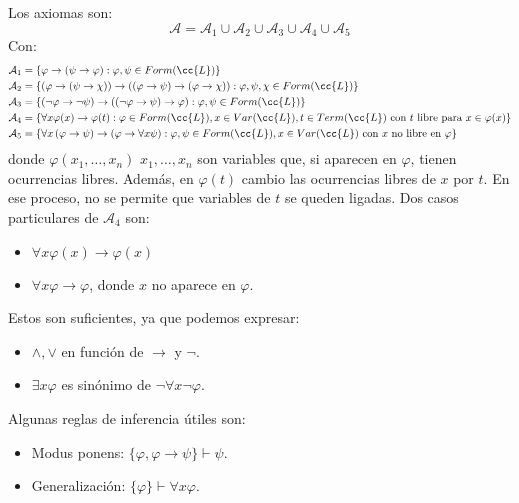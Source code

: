 Los axiomas son:
\begin{equation*}
    \mathcal{A} = \mathcal{A}_1 \cup \mathcal{A}_2 \cup \mathcal{A}_3 \cup \mathcal{A}_4 \cup \mathcal{A}_5
\end{equation*}
Con:
\begin{align*}
    \mathcal{A}_1 &= \{\varphi\to(\psi\to\varphi) : \varphi,\psi \in Form(\cc{L})\} \\
    \mathcal{A}_2 &= \{(\varphi\to(\psi\to\chi))\to((\varphi\to\psi)\to(\varphi\to\chi)) : \varphi,\psi,\chi \in Form(\cc{L})\} \\
    \mathcal{A}_3 &= \{(\lnot\varphi\to\lnot\psi)\to((\lnot\varphi\to\psi)\to\varphi) : \varphi,\psi \in Form(\cc{L})\}\\
    \mathcal{A}_4 &= \{\forall x\varphi(x)\to \varphi(t) : \varphi\in Form(\cc{L}), x\in Var(\cc{L}), t\in Term(\cc{L}) \ \text{con $t$ libre para}\  x\in \varphi(x)\} \\
    \mathcal{A}_5 &= \{\forall x\left(\varphi\to\psi\right)\to\left(\varphi\to\forall x\psi\right) : \varphi,\psi\in Form(\cc{L}), x\in Var(\cc{L}) \ \text{con $x$ no libre en $\varphi$}\}
\end{align*}
donde $\varphi(x_1,\ldots,x_n)$ $x_1,\ldots,x_n$ son variables que, si aparecen en $\varphi$, tienen ocurrencias libres. Además, en $\varphi(t)$ cambio las ocurrencias libres de $x$ por $t$. En ese proceso, no se permite que variables de $t$ se queden ligadas. Dos casos particulares de $\mathcal{A}_4$ son:
\begin{itemize}
    \item $\forall x\varphi(x)\to \varphi(x)$
    \item $\forall x\varphi \to \varphi$, donde $x$ no aparece en $\varphi$.
\end{itemize}

Estos son suficientes, ya que podemos expresar:
\begin{itemize}
    \item $\land, \lor$ en función de $\to$ y $\lnot$.
    \item $\exists x\varphi$ es sinónimo de $\lnot\forall x\lnot\varphi$.
\end{itemize}


Algunas reglas de inferencia útiles son:
\begin{itemize}
    \item Modus ponens: $\{\varphi,\varphi\to\psi\}\vdash\psi$.
    \item Generalización: $\{\varphi\}\vdash\forall x\varphi$.
\end{itemize}

